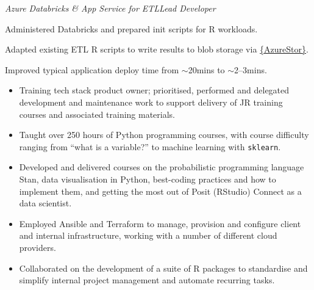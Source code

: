 \documentclass[12pt, a4paper]{article}
\begin{document}
%
       {\emph{Azure Databricks \& App Service for ETL\hfill{}Lead Developer}

       \begin{adjustwidth}{0em}{3em}

       Administered Databricks and prepared init scripts for R workloads.

       Adapted existing ETL R scripts to write results to blob storage via
       \href{https://cran.r-project.org/web/packages/AzureStor/vignettes/intro.html}%
            {\{AzureStor\}}.

       Improved typical application deploy time from $\sim$20mins to $\sim$2--3mins.

       \end{adjustwidth}}%

\vspace{-.4em}


\begin{itemize}[
    itemsep=.2em,
    labelwidth=2em,
    leftmargin=3.25em,
    topsep=0em]

     \item[\faIcon{layer-group}]%
       {Training tech stack product owner; prioritised, performed and delegated development and
       maintenance work to support delivery of JR training courses and associated training
       materials.}

     \item[\faIcon{python}]%
       {Taught over 250 hours of Python programming courses, with course difficulty
        ranging from ``what is a variable?'' to machine learning with \texttt{sklearn}.}%

     \item[\faIcon{chalkboard-teacher}]%
       {Developed and delivered courses on the probabilistic programming
        language Stan, data visualisation in Python, best-coding practices and how to
        implement them, and getting the most out of Posit (RStudio) Connect as a data
        scientist.}%

    \item[\faIcon{cloud}]%
       {Employed Ansible and Terraform to manage, provision and configure client and
        internal infrastructure, working with a number of different cloud providers.}%

    \item[\faIcon{r-project}]%
       {Collaborated on the development of a suite of R packages to standardise and
        simplify internal project management and automate recurring tasks.}

\end{itemize}
\end{document}
